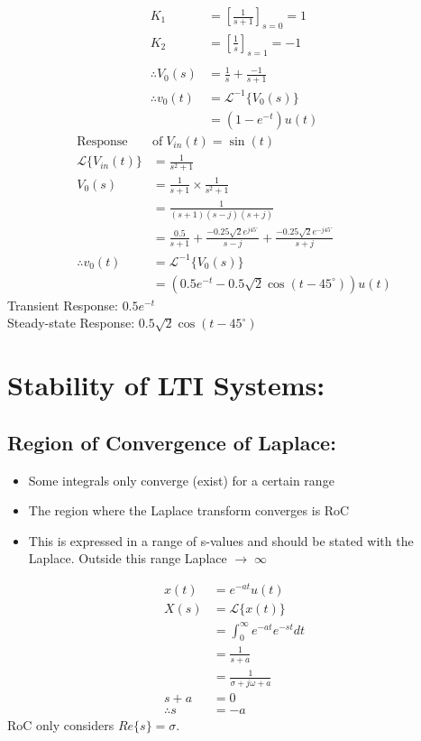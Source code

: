 \documentclass[a5paper]{article}
\newcommand{\Lap}{\mathcal{L}}
\begin{document}
	\begin{align*}
		K_{1}&=[\frac{1}{s+1}]_{s=0}=1\\
		K_{2}&=[\frac{1}{s}]_{s=1}=-1\\\\
		\therefore V_{0}(s)&=\frac{1}{s}+\frac{-1}{s+1}\\
		\therefore v_{0}(t)&=\Lap^{-1}\{V_{0}(s)\}\\
		&=(1-e^{-t})u(t)
	\end{align*}
	\begin{align*}
		\text{Response}\;&\text{of}\;V_{in}(t)=\sin(t)\\
		\Lap\{V_{in}(t)\}&=\frac{1}{s^{2}+1}\\
		V_{0}(s)&=\frac{1}{s+1}\times\frac{1}{s^{2}+1}\\
		&=\frac{1}{(s+1)(s-j)(s+j)}\\
		&=\frac{0.5}{s+1}+\frac{-0.25\sqrt{2}e^{j45^{\circ}}}{s-j}+\frac{-0.25\sqrt{2}e^{-j45^{\circ}}}{s+j}\\
		\therefore v_{0}(t)&=\Lap^{-1}\{V_{0}(s)\}\\
		&=(0.5e^{-t}-0.5\sqrt{2}\cos{(t-45^{\circ})})u(t)
	\end{align*}
	Transient Response: $0.5e^{-t}$\\
	Steady-state Response: $0.5\sqrt{2}\cos{(t-45^{\circ})}$

	\section{Stability of LTI Systems:}
	\subsection{Region of Convergence of Laplace:}
	\begin{itemize}
		\item Some integrals only converge (exist) for a certain range
		\item The region where the Laplace transform converges is RoC
		\item This is expressed in a range of s-values and should be stated with the Laplace. Outside this range Laplace $\to\;\infty$
	\end{itemize}
	\begin{align*}
		x(t)&=e^{-at}u(t)\\
		X(s)&=\Lap\{x(t)\}\\
		&=\int^{\infty}_{0}e^{-at}e^{-st}dt\\
		&=\frac{1}{s+a}\\
		&=\frac{1}{\sigma+j\omega+a}\\
		s+a&=0\\
		\therefore s&=-a
	\end{align*}
	RoC only considers $Re\{s\}=\sigma$.
\end{document}
